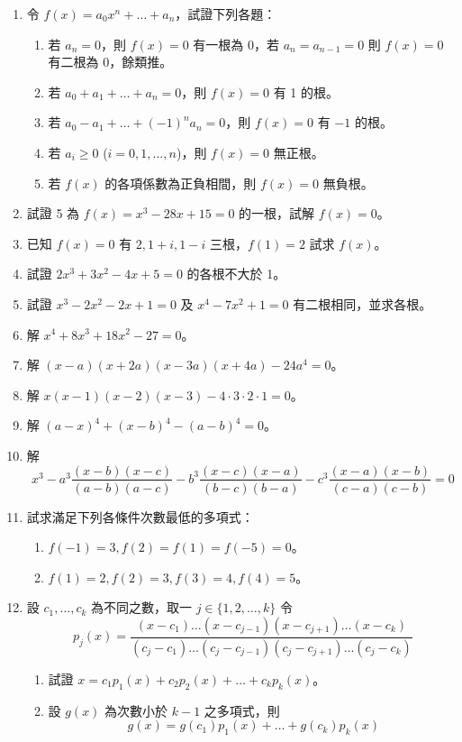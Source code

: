 \begin{enumerate}[label=\arabic*., leftmargin=2em]
  \item 令 $f(x)=a_0 x^n + \dots + a_n$，試證下列各題：
  \begin{enumerate}[label=(\roman*)]
    \item 若 $a_n=0$，則 $f(x)=0$ 有一根為 0，若 $a_n=a_{n-1}=0$ 則 $f(x)=0$ 有二根為 0，餘類推。
    \item 若 $a_0+a_1+\dots+a_n=0$，則 $f(x)=0$ 有 1 的根。
    \item 若 $a_0-a_1+\dots+(-1)^n a_n=0$，則 $f(x)=0$ 有 $-1$ 的根。
    \item 若 $a_i \ge 0$ ($i=0, 1, \dots, n$)，則 $f(x)=0$ 無正根。
    \item 若 $f(x)$ 的各項係數為正負相間，則 $f(x)=0$ 無負根。
  \end{enumerate}

  \item 試證 5 為 $f(x)=x^3-28x+15=0$ 的一根，試解 $f(x)=0$。

  \item 已知 $f(x)=0$ 有 $2, 1+i, 1-i$ 三根，$f(1)=2$ 試求 $f(x)$。

  \item 試證 $2x^3+3x^2-4x+5=0$ 的各根不大於 1。

  \item 試證 $x^3-2x^2-2x+1=0$ 及 $x^4-7x^2+1=0$ 有二根相同，並求各根。

  \item 解 $x^4+8x^3+18x^2-27=0$。

  \item 解 $(x-a)(x+2a)(x-3a)(x+4a)-24a^4=0$。

  \item 解 $x(x-1)(x-2)(x-3)-4 \cdot 3 \cdot 2 \cdot 1=0$。

  \item 解 $(a-x)^4+(x-b)^4-(a-b)^4=0$。

  \item 解
  \[ x^3 - a^3 \dfrac{(x-b)(x-c)}{(a-b)(a-c)} - b^3 \dfrac{(x-c)(x-a)}{(b-c)(b-a)} - c^3 \dfrac{(x-a)(x-b)}{(c-a)(c-b)} = 0 \]

  \item 試求滿足下列各條件次數最低的多項式：
  \begin{enumerate}[label=(\roman*)]
    \item $f(-1)=3, f(2)=f(1)=f(-5)=0$。
    \item $f(1)=2, f(2)=3, f(3)=4, f(4)=5$。
  \end{enumerate}

  \item 設 $c_1, \dots, c_k$ 為不同之數，取一 $j \in \{1, 2, \dots, k\}$ 令
  \[ p_j(x) = \dfrac{(x-c_1)\dots(x-c_{j-1})(x-c_{j+1})\dots(x-c_k)}{(c_j-c_1)\dots(c_j-c_{j-1})(c_j-c_{j+1})\dots(c_j-c_k)} \]
  \begin{enumerate}[label=(\roman*)]
    \item 試證 $x = c_1 p_1(x) + c_2 p_2(x) + \dots + c_k p_k(x)$。
    \item 設 $g(x)$ 為次數小於 $k-1$ 之多項式，則
    \[ g(x) = g(c_1)p_1(x) + \dots + g(c_k)p_k(x) \]
  \end{enumerate}
\end{enumerate}

